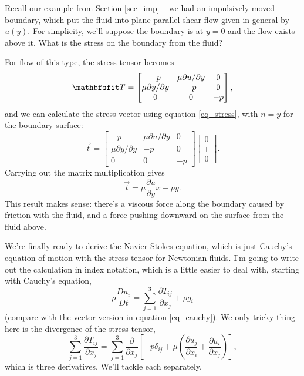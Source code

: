 \begin{example}
Recall our example from Section \ref{sec_imp} -- we had an impulsively moved boundary, which put the fluid into plane parallel shear flow given in general by $u(y)$.  For simplicity, we'll suppose the boundary is at $y=0$ and the flow exists above it.  What is the stress on the boundary from the fluid?

For flow of this type, the stress tensor becomes
\begin{equation}
\tens{T} = \begin{bmatrix}
-p & \mu \partial u / \partial y & 0 \\
\mu \partial y / \partial y & -p & 0 \\
0 & 0 & -p
\end{bmatrix},
\end{equation}
and we can calculate the stress vector using equation \ref{eq_stress}, with $\unit{n} = \unit{y}$ for the boundary surface:
\[
\vec{t} = \begin{bmatrix}
-p & \mu \partial u / \partial y & 0 \\
\mu \partial y / \partial y & -p & 0 \\
0 & 0 & -p
\end{bmatrix}
\begin{bmatrix}
0 \\ 1 \\ 0
\end{bmatrix}.
\]
Carrying out the matrix multiplication gives
\[
\vec{t} = \mu \frac{\partial u}{\partial y} \unit{x} - p \unit{y}.
\]
This result makes sense: there's a viscous force along the boundary caused by friction with the fluid, and a force pushing downward on the surface from the fluid above.
\end{example}

We're finally ready to derive the Navier-Stokes equation, which is just Cauchy's equation of motion with the stress tensor for Newtonian fluids.  I'm going to write out the calculation in index notation, which is a little easier to deal with, starting with Cauchy's equation,
\[
\rho \frac{Du_i}{Dt} = \sum_{j=1}^3 \frac{\partial T_{ij}}{\partial x_j} + \rho g_i
\]
(compare with the vector version in equation \ref{eq_cauchy}).  We only tricky thing here is the divergence of the stress tensor,
\[
\sum_{j=1}^3 \frac{\partial T_{ij}}{\partial x_j} = \sum_{j=1}^3 \frac{\partial }{\partial x_j} \left[ -p \delta_{ij} + \mu \left( \frac{\partial u_j}{\partial x_i} + \frac{\partial u_i}{\partial x_j} \right) \right],
\]
which is three derivatives.  We'll tackle each separately.

